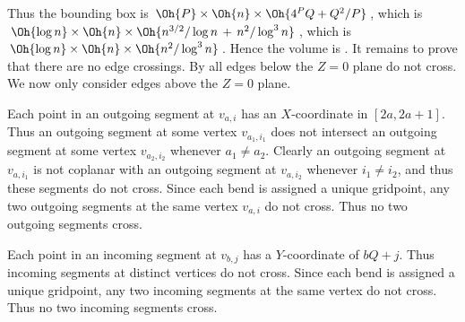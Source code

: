 \documentclass[10pt,twocolumn]{article}
\begin{document}

Thus the bounding box is $\Oh{P}\times\Oh{n}\times\Oh{4^PQ+Q^2/P}$, which is 
$\Oh{\log n}\times\Oh{n}\times\Oh{n^{3/2}/\log n\,+\,n^2/\log^3n}$, which is
$\Oh{\log n}\times\Oh{n}\times\Oh{n^2/\log^3n}$. Hence the volume is
. It remains to prove that there are no edge crossings. By 
 all edges below the $Z=0$ plane do not cross.
We now only consider edges above the $Z=0$ plane. 

Each point in an outgoing segment at $v_{a,i}$ has an $X$-coordinate in
$[2a,2a+1]$. Thus an outgoing segment at some vertex $v_{a_1,i_1}$ does not
intersect an outgoing segment at some vertex $v_{a_2,i_2}$ whenever $a_1\ne
a_2$. Clearly an outgoing segment at $v_{a,i_1}$ is not coplanar with an
outgoing segment at $v_{a,i_2}$ whenever $i_1\ne i_2$, and thus these segments
do not cross. Since each bend is assigned a unique gridpoint, any two outgoing
segments at the same vertex $v_{a,i}$ do not cross. Thus no two outgoing
segments cross.

Each point in an incoming segment at $v_{b,j}$ has a $Y$-coordinate of $bQ+j$.
Thus incoming segments at distinct vertices do not cross.  Since each bend is
assigned a unique gridpoint, any two incoming segments at the same vertex do not
cross. Thus no two incoming segments cross.
\end{document}
